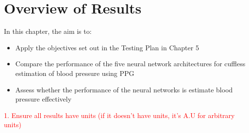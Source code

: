\section{Overview of Results}
In this chapter, the aim is to:
\begin{itemize}
    \item Apply the objectives set out in the Testing Plan in Chapter 5
    \item Compare the performance of the five neural network architectures for cuffless estimation of blood pressure using PPG
    \item Assess whether the performance of the neural networks is estimate blood pressure effectively
\end{itemize}

\textcolor{red}{1. Ensure all results have units (if it doesn't have units, it's A.U for arbitrary units)}

